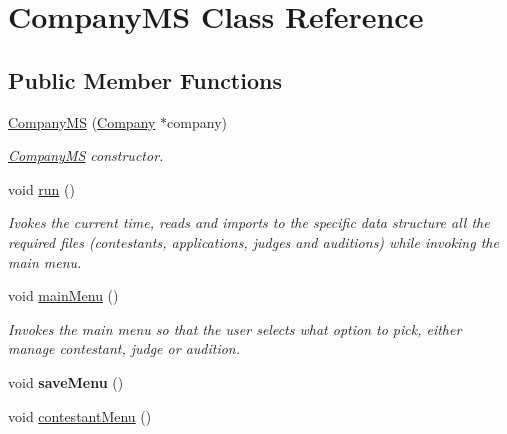 \hypertarget{class_company_m_s}{}\section{Company\+MS Class Reference}
\label{class_company_m_s}
\subsection*{Public Member Functions}
\begin{DoxyCompactItemize}
\item 
\hyperlink{class_company_m_s_afc748771e6feb5ac47d3714ccda5bfea}{Company\+MS} (\hyperlink{class_company}{Company} $\ast$company)
\begin{DoxyCompactList}\small\item\em \hyperlink{class_company_m_s}{Company\+MS} constructor. \end{DoxyCompactList}\item 
\mbox{\label{class_company_m_s_ac6978587e70f3685784541f2c27058f3}} 
void \hyperlink{class_company_m_s_ac6978587e70f3685784541f2c27058f3}{run} ()
\begin{DoxyCompactList}\small\item\em Ivokes the current time, reads and imports to the specific data structure all the required files (contestants, applications, judges and auditions) while invoking the main menu. \end{DoxyCompactList}\item 
\mbox{\label{class_company_m_s_a7288a77ae53701d3184cba99850edb45}} 
void \hyperlink{class_company_m_s_a7288a77ae53701d3184cba99850edb45}{main\+Menu} ()
\begin{DoxyCompactList}\small\item\em Invokes the main menu so that the user selects what option to pick, either manage contestant, judge or audition. \end{DoxyCompactList}\item 
\mbox{\label{class_company_m_s_a8e17682219662edecd475fe578403c0f}} 
void {\bfseries save\+Menu} ()
\item 
\mbox{\label{class_company_m_s_a34d80c6a9724b088bbbeea878d96cf16}} 
void \hyperlink{class_company_m_s_a34d80c6a9724b088bbbeea878d96cf16}{contestant\+Menu} ()

\end{DoxyCompactItemize}
